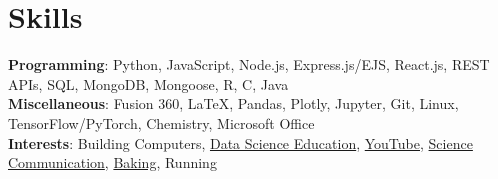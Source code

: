 \documentclass[letterpaper,11pt]{article}
\begin{document}
\section{Skills}
 \begin{itemize}[leftmargin=0.15in, label={}]
  \small{
    \item{
     \textbf{Programming}{: Python, JavaScript, Node.js, Express.js/EJS, React.js, REST APIs, SQL, MongoDB, Mongoose, R, C, Java} \\
     \textbf{Miscellaneous}{: Fusion 360, \LaTeX, Pandas, Plotly, Jupyter, Git, Linux, TensorFlow/PyTorch, Chemistry, Microsoft Office} \\
     \textbf{Interests}{: Building Computers, \href{https://socialsciences.uchicago.edu/news/data4all-workshop-introduces-high-school-students-data-science-research}{Data Science Education}, \href{https://www.youtube.com/channel/UCub38TXhT_RZkwLwyXtTpaA}{YouTube}, \href{https://tthspectrum.org/articles/organic-electronics-sustainable-storage-renewable-energy/}{Science Communication}, \href{https://www.instagram.com/whedgehogbaking/}{Baking}, Running}
    }
  }
 \end{itemize}


\end{document}
